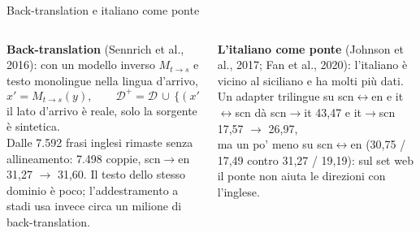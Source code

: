 \documentclass[aspectratio=169]{beamer}
\newcommand{\T}[2]{#2}
\newcommand{\T}[2]{#1}
\begin{document}
\begin{frame}{\T{Back-translation and the Italian bridge}{Back-translation e italiano come ponte}}
  \begin{columns}[t]
    \begin{column}{0.5\textwidth}
      \footnotesize
      \textbf{Back-translation} (Sennrich et al., 2016):
      \T{with a reverse model $M_{t\to s}$ and monolingual target text,}%
      {con un modello inverso $M_{t\to s}$ e testo monolingue nella lingua d'arrivo,}
      \[
        x' = M_{t\to s}(y),\qquad \mathcal D^{+}=\mathcal D\,\cup\,\{(x',\,y)\};
      \]
      \T{the target side is real, only the source is synthetic.}%
      {il lato d'arrivo \`e reale, solo la sorgente \`e sintetica.}\\[1mm]
      \T{From the 7,592 English sentences left unaligned: 7,498 pairs, scn$\to$en 31.27 $\to$
      31.60. The in-domain pool is small; the staged training uses about a million
      back-translations instead.}%
      {Dalle 7.592 frasi inglesi rimaste senza allineamento: 7.498 coppie, scn$\to$en 31,27
      $\to$ 31,60. Il testo dello stesso dominio \`e poco; l'addestramento a stadi usa invece circa un milione di back-translation.}
    \end{column}
    \begin{column}{0.5\textwidth}
      \footnotesize
      \textbf{\T{Italian as a bridge}{L'italiano come ponte}} (Johnson et al., 2017; Fan et al.,
      2020): \T{Italian is close to Sicilian and has much more data. A trilingual adapter on
      scn$\leftrightarrow$en and it$\leftrightarrow$scn gives scn$\to$it 43.47 and it$\to$scn
      17.57 $\to$ 26.97,}%
      {l'italiano \`e vicino al siciliano e ha molti pi\`u dati. Un adapter trilingue su
      scn$\leftrightarrow$en e it$\leftrightarrow$scn d\`a scn$\to$it 43,47 e it$\to$scn
      17,57 $\to$ 26,97,}\\[1mm]
      \T{but slightly less on scn$\leftrightarrow$en (30.75 / 17.49 against 31.27 / 19.19):
      on the web set the bridge does not help the English directions.}%
      {ma un po' meno su scn$\leftrightarrow$en (30,75 / 17,49 contro 31,27 / 19,19): sul set
      web il ponte non aiuta le direzioni con l'inglese.}
    \end{column}
  \end{columns}
\end{frame}
\end{document}
